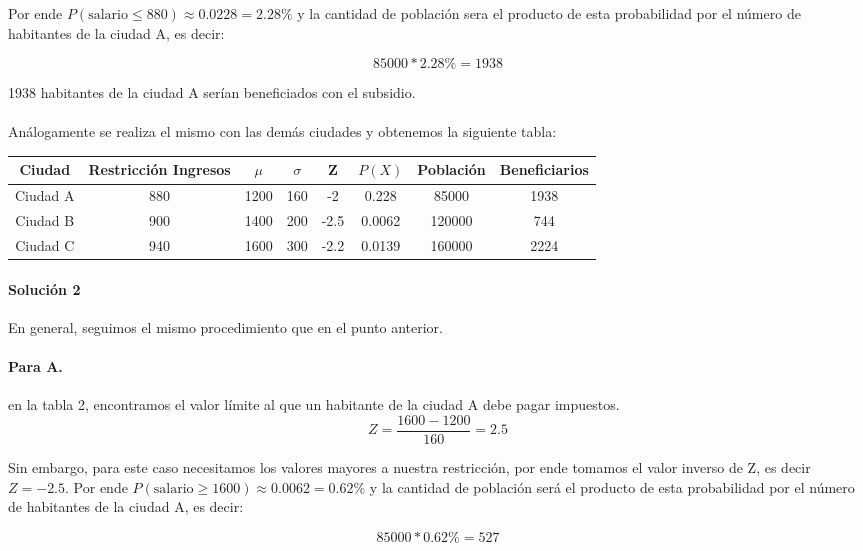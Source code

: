 \documentclass{article}
\begin{document}
Por ende $P(\text{salario} \leq 880) \approx 0.0228 = 2.28\%$ y la cantidad de  población sera el producto de esta probabilidad por el número de habitantes de la ciudad A, es decir: 

$$85000*2.28\% = 1938$$

1938 habitantes de la ciudad A serían beneficiados con el subsidio.

\paragraph{} Análogamente se realiza el mismo con las demás ciudades y obtenemos la siguiente tabla:


\begin{center}
	\begin{tabular}{ | c | c | c | c | c | c | c | c | }
		\hline
		\textbf{Ciudad} & \textbf{Restricción Ingresos} & \textbf{$\mu$} & \textbf{$\sigma$} & \textbf{Z} & \textbf{$P(X)$} & \textbf{Población} & \textbf{Beneficiarios}\\
		\hline
		Ciudad A & 880 & 1200 & 160 & -2 & 0.228 & 85000 & 1938 \\
		\hline
		Ciudad B & 900 & 1400 & 200 & -2.5 & 0.0062 & 120000 & 744 \\
		\hline
		Ciudad C & 940 & 1600 & 300 & -2.2 & 0.0139  & 160000 & 2224 \\
		\hline
	\end{tabular}
\end{center}

\paragraph{Solución 2} En general, seguimos el mismo procedimiento que en el punto anterior.

\paragraph{Para A.} en la tabla 2, encontramos el valor límite al que un habitante de la ciudad A debe pagar impuestos.
$$Z = \frac{1600 - 1200}{160} =  2.5$$

Sin embargo, para este caso necesitamos los valores mayores a nuestra restricción, por ende tomamos el valor inverso de Z, es decir $Z = -2.5$. Por ende $P(\text{salario} \geq 1600) \approx 0.0062 = 0.62\%$ y la cantidad de  población será el producto de esta probabilidad por el número de habitantes de la ciudad A, es decir: 

$$85000*0.62\% = 527$$
\end{document}
